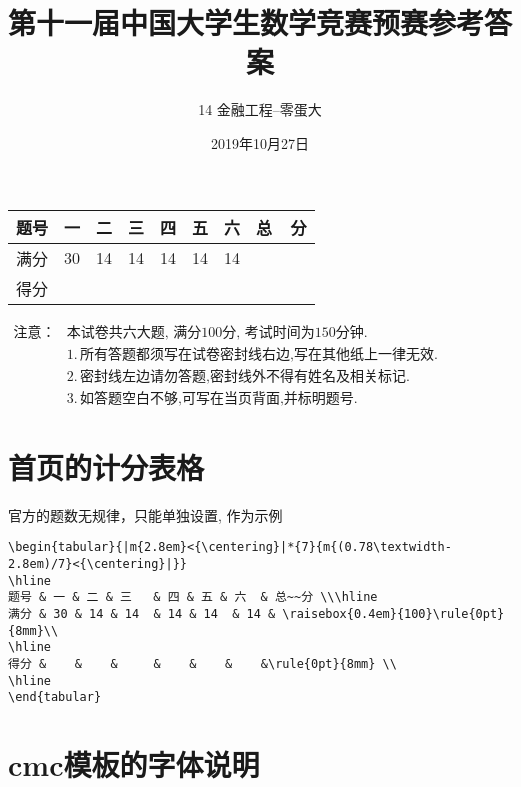 \documentclass[11pt,twoside]{article} %
\title{第十一届中国大学生数学竞赛预赛参考答案}
\author{14 金融工程--零蛋大}
\date{2019年10月27日}
\begin{document}
\maketitle
\begin{flushleft}
\begin{tabular}{|m{2.8em}<{\centering}|*{7}{m{}<{\centering}|}}
\hline
题号 & 一 & 二 & 三   & 四 & 五 & 六  & 总~~分 \\\hline
满分 & 30 & 14 & 14  & 14 & 14  & 14 & \raisebox{0.4em}{100}\rule{0pt}{8mm}\\
\hline
得分 &    &    &     &    &    &    &\rule{0pt}{8mm} \\
\hline		
\end{tabular}\vspace*{0.6em}		
$\begin{aligned}
\mbox{注意：}
&\text{本试卷共六大题, 满分100分, 考试时间为150分钟.}\\
&1.\,\mbox{所有答题都须写在试卷密封线右边,写在其他纸上一律无效}.\\
&2.\,\mbox{密封线左边请勿答题,密封线外不得有姓名及相关标记}.\\
&3.\,\mbox{如答题空白不够,可写在当页背面,并标明题号}.
\end{aligned}$		
\end{flushleft}
\setlength{\marginparsep}{-0.8cm}
	

\section{首页的计分表格}
官方的题数无规律，只能单独设置, 作为示例
\begin{lstlisting}[style=tsdtex]
\begin{tabular}{|m{2.8em}<{\centering}|*{7}{m{(0.78\textwidth-2.8em)/7}<{\centering}|}}
\hline
题号 & 一 & 二 & 三   & 四 & 五 & 六  & 总~~分 \\\hline
满分 & 30 & 14 & 14  & 14 & 14  & 14 & \raisebox{0.4em}{100}\rule{0pt}{8mm}\\
\hline
得分 &    &    &     &    &    &    &\rule{0pt}{8mm} \\
\hline		
\end{tabular}
\end{lstlisting}

\section{cmc模板的字体说明}
\end{document}

